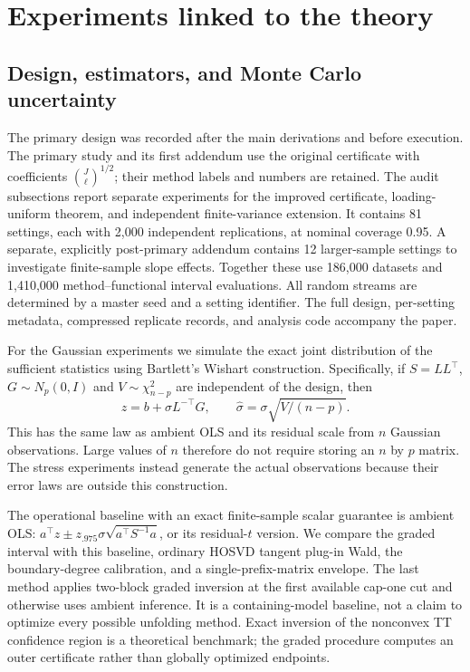\section{Experiments linked to the theory}\label{sec:experiments}
\subsection{Design, estimators, and Monte Carlo uncertainty}
The primary design was recorded after the main derivations and before execution. The primary study and its first addendum use the original certificate with coefficients $\binom J\ell^{1/2}$; their method labels and numbers are retained. The audit subsections report separate experiments for the improved certificate, loading-uniform theorem, and independent finite-variance extension. It contains 81 settings, each with 2,000 independent replications, at nominal coverage 0.95. A separate, explicitly post-primary addendum contains 12 larger-sample settings to investigate finite-sample slope effects. Together these use 186,000 datasets and 1,410,000 method--functional interval evaluations. All random streams are determined by a master seed and a setting identifier. The full design, per-setting metadata, compressed replicate records, and analysis code accompany the paper.

For the Gaussian experiments we simulate the exact joint distribution of the sufficient statistics using Bartlett's Wishart construction. Specifically, if $S=LL^\top$, $G\sim N_p(0,I)$ and $V\sim\chi^2_{n-p}$ are independent of the design, then
\[
 z=b+\sigma L^{-\top}G,\qquad \widehat\sigma=\sigma\sqrt{V/(n-p)}.
\]
This has the same law as ambient OLS and its residual scale from $n$ Gaussian observations. Large values of $n$ therefore do not require storing an $n$ by $p$ matrix. The stress experiments instead generate the actual observations because their error laws are outside this construction.

The operational baseline with an exact finite-sample scalar guarantee is ambient OLS: $a^\top z\pm z_{.975}\sigma\sqrt{a^\top S^{-1}a}$, or its residual-$t$ version. We compare the graded interval with this baseline, ordinary HOSVD tangent plug-in Wald, the boundary-degree calibration, and a single-prefix-matrix envelope. The last method applies two-block graded inversion at the first available cap-one cut and otherwise uses ambient inference. It is a containing-model baseline, not a claim to optimize every possible unfolding method. Exact inversion of the nonconvex TT confidence region is a theoretical benchmark; the graded procedure computes an outer certificate rather than globally optimized endpoints.

